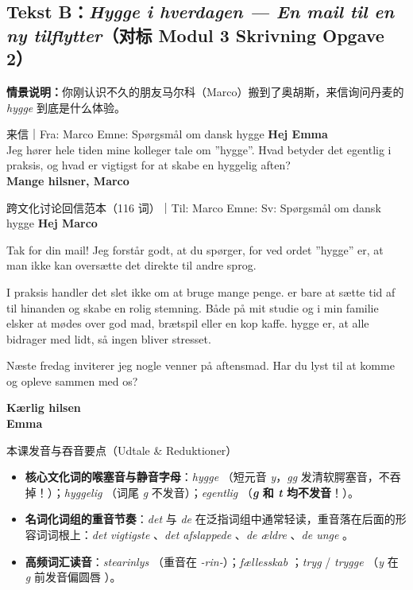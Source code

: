 \subsection*{Tekst B：\textit{Hygge i hverdagen --- En mail til en ny tilflytter}（对标 Modul 3 Skrivning Opgave 2）}

\textbf{情景说明：}你刚认识不久的朋友马尔科（Marco）搬到了奥胡斯，来信询问丹麦的 \textit{hygge} 到底是什么体验。

\begin{emailbox}{来信｜Fra: Marco \quad Emne: Spørgsmål om dansk hygge}
\textbf{Hej Emma}\\
Jeg hører hele tiden mine kolleger tale om ”hygge”. Hvad betyder det egentlig i praksis, og hvad er vigtigst for at skabe en hyggelig aften?\\
\textbf{Mange hilsner, Marco}
\end{emailbox}

\begin{emailbox}{跨文化讨论回信范本（116 词）｜Til: Marco \quad Emne: Sv: Spørgsmål om dansk hygge}
\textbf{Hej Marco}

Tak for din mail! Jeg forstår godt, at du spørger, for  ved ordet ”hygge” er, at man ikke kan oversætte det direkte til andre sprog.

I praksis handler det slet ikke om at bruge mange penge.  er bare at sætte tid af til hinanden og skabe en rolig stemning. Både  på mit studie og  i min familie elsker at mødes over god mad, brætspil eller en kop kaffe.  hygge er, at alle bidrager med lidt, så ingen bliver stresset.

Næste fredag inviterer jeg nogle venner på aftensmad. Har du lyst til at komme og opleve  sammen med os?

\textbf{Kærlig hilsen}\\
\textbf{Emma}
\end{emailbox}

\begin{tipbox}{本课发音与吞音要点（Udtale \& Reduktioner）}
\begin{itemize}
  \item \textbf{核心文化词的喉塞音与静音字母}：\textit{hygge} （短元音 \textit{y}，\textit{gg} 发清软腭塞音，不吞掉！）；\textit{hyggelig} （词尾 \textit{g} 不发音）；\textit{egentlig} （\textbf{\textit{g} 和 \textit{t} 均不发音}！）。
  \item \textbf{名词化词组的重音节奏}：\textit{det} 与 \textit{de} 在泛指词组中通常轻读，重音落在后面的形容词词根上：\textit{det vigtigste} 、\textit{det afslappede} 、\textit{de ældre} 、\textit{de unge} 。
  \item \textbf{高频词汇读音}：\textit{stearinlys} （重音在 \textit{-rin-}）；\textit{fællesskab} ；\textit{tryg}  / \textit{trygge} （\textit{y} 在 \textit{g} 前发音偏圆唇 ）。
\end{itemize}
\end{tipbox}

